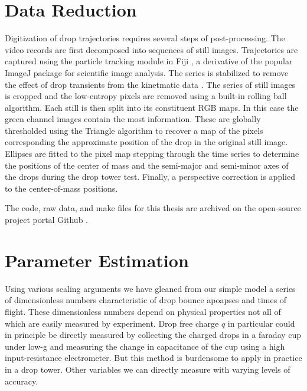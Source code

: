 \documentclass[12pt,a4paper,oneside]{book}
\begin{document}
\section{Data Reduction}
Digitization of drop trajectories requires several steps of post-processing. The video records are first decomposed into sequences of still images. Trajectories are captured using the particle tracking module in Fiji \cite{schindelin_fiji:_2012}, a derivative of the popular ImageJ \cite{schneider_nih_2012} package for scientific image analysis. The series is stabilized to remove the effect of drop transients from the kinetmatic data \cite{li_image_2008}. The series of still images is cropped and the low-entropy pixels are removed using a built-in rolling ball algorithm. Each still is then split into its constituent RGB maps. In this case the green channel images contain the most information. These are globally thresholded using the Triangle algorithm to recover a map of the pixels corresponding the approximate position of the drop in the original still image. Ellipses are fitted to the pixel map stepping through the time series to determine the positions of the center of mass and the semi-major and semi-minor axes of the drops during the drop tower test. Finally, a perspective correction is applied to the center-of-mass positions. 

The code, raw data, and make files for this thesis are archived on the open-source project portal Github \cite{schmidt_droplet_electro-bounce:_2017}.

\section{Parameter Estimation}
Using various scaling arguments we have gleaned from our simple model a series of dimensionless numbers characteristic of drop bounce apoapses and times of flight. These dimensionless numbers depend on physical properties not all of which are easily measured by experiment. Drop free charge $q$ in particular could in principle be directly measured by collecting the charged drops in a faraday cup under low-g and measuring the change in capacitance of the cup using a high input-resistance electrometer. But this method is burdensome to apply in practice in a drop tower. Other variables we can directly measure with varying levels of accuracy. 
\end{document}
